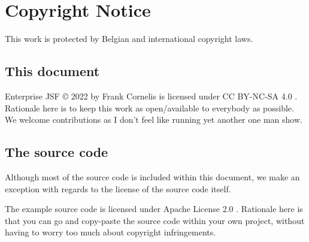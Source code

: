 %

\chapter*{Copyright Notice}
This work is protected by Belgian and international copyright laws.

\section*{This document}
Enterprise JSF © 2022 by Frank Cornelis is licensed under CC BY-NC-SA 4.0 \cite{CCLicense}.
Rationale here is to keep this work as open/available to everybody as possible.
We welcome contributions as I don't feel like running yet another one man show.

\section*{The source code}
Although most of the source code is included within this document,
we make an exception with regards to the license of the source code itself.

The example source code is licensed under Apache License 2.0 \cite{ApacheLicense}.
Rationale here is that you can go and copy-paste the source code within your own project,
without having to worry too much about copyright infringements.
